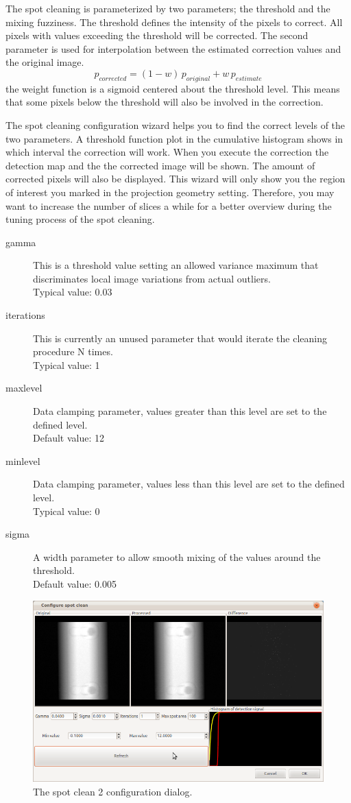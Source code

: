 \documentclass[a4paper]{scrreprt}
\begin{document}
The spot cleaning is parameterized by two parameters; the threshold and the
mixing fuzziness. The threshold defines the intensity of the pixels to correct.
All pixels with values exceeding the threshold will be corrected. The second
parameter is used for interpolation between the estimated correction values and
the original image.
\[
p_{corrected}=(1-w)\,p_{original}+w\,p_{estimate}
\]
the weight function is a sigmoid centered about the threshold level. This means
that some pixels below the threshold will also be involved in the correction.

The spot cleaning configuration wizard helps you to find the correct levels of
the two parameters. A threshold function plot in the cumulative histogram shows
in which interval the correction will work. When you execute the correction the
detection map and the the corrected image will be shown. The amount of corrected
pixels will also be displayed. This wizard will only show you the region of
interest you marked in the projection geometry setting. Therefore, you may want
to increase the number of slices a while for a better overview during the tuning
process of the spot cleaning.
\begin{description}
 \item[gamma] This is a threshold value setting an allowed variance maximum
that discriminates local image variations from actual outliers. \\
Typical value: 0.03
 \item[iterations] This is currently an unused parameter that would iterate
the cleaning procedure N times.\\
Typical value: 1
 \item[maxlevel] Data clamping parameter, values greater than this level are
set to the defined level.\\ Default value: 12
 \item[minlevel]Data clamping parameter, values less than this level are
set to the defined level.\\ Typical value: 0
 \item[sigma] A width parameter to allow smooth mixing of the values around
the threshold. \\ Default value: 0.005
\end{description}
\begin{figure}[ht!]
\centering
\includegraphics[scale=0.5]{figures/ConfSpotClean2.png}
\caption{The spot clean 2 configuration dialog.}
\end{figure}
\end{document}
